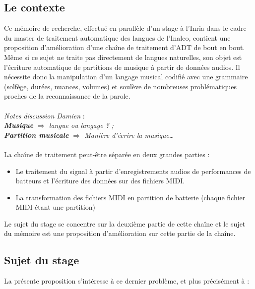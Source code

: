 \subsection*{Le contexte}
Ce mémoire de recherche, effectué en parallèle d’un stage à l’Inria dans le cadre du master de traitement automatique des langues de l’Inalco, contient une proposition d’amélioration d’une chaîne de traitement d’ADT de bout en bout.\\
Même si ce sujet ne traite pas directement de langues naturelles, son objet est l’écriture automatique de partitions de musique à partir de données audios. Il nécessite donc la manipulation d’un langage musical codifié avec une grammaire (solfège, durées, nuances, volumes) et soulève de nombreuses problématiques proches de la reconnaissance de la parole.\\\\
\textit{Notes discussion Damien} :\\
\textit{\textbf{Musique} $\Rightarrow$ langue ou langage ? ;\\
\textbf{Partition musicale} $\Rightarrow$ Manière d’écrire la musique…}\\\\
La chaîne de traitement peut-être séparée en deux grandes parties :
\begin{itemize}
	\item Le traitement du signal à partir d’enregistrements audios de performances de batteurs et l’écriture des données sur des fichiers MIDI.
	\item La transformation des fichiers MIDI en partition de batterie (chaque fichier MIDI étant une partition)\\
\end{itemize}

Le sujet du stage se concentre sur la deuxième partie de cette chaîne et le sujet du mémoire est une proposition d’amélioration sur cette partie de la chaîne.

\subsection*{Sujet du stage}

La présente proposition s'intéresse à ce dernier problème, et plus précisément à :\\

